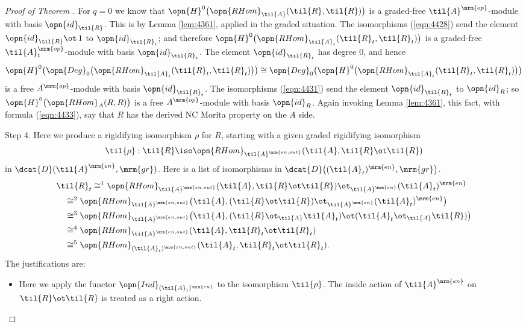 \begin{proof}[Proof of Theorem \tup{\ref{thm:4395}}]
For $q = 0$ we know that 
$\opn{H}^0 \bigl( \opn{RHom}_{\til{A}}(\til{R}, \til{R}) \bigr)$
is a graded-free $\til{A}^{\mrm{op}}$-module with basis $\opn{id}_{\til{R}}$. 
This is by Lemma \ref{lem:4361}, applied in the graded situation. 
The isomorphisms (\ref{eqn:4428}) send the element
$\opn{id}_{\til{R}} \ot \, 1$ to $\opn{id}_{\til{R}_t}$; and therefore \lb 
$\opn{H}^0 \bigl( \opn{RHom}_{\til{A}_t}(\til{R}_t, \til{R}_t) \bigr)$
is a graded-free $\til{A}_t^{\mrm{op}}$-module with basis 
$\opn{id}_{\til{R}_t}$.
The element $\opn{id}_{\til{R}_t}$ has degree $0$, and hence  
\[ \opn{H}^0 \bigl(  \opn{Deg}_0 \bigl( \opn{RHom}_{\til{A}_t}(\til{R}_t, 
\til{R}_t) \bigr) \bigr) \cong 
\opn{Deg}_0 \bigl( \opn{H}^0 \bigl(   \opn{RHom}_{\til{A}_t}(\til{R}_t, 
\til{R}_t) \bigr) \bigr) \]
is a free $A^{\mrm{op}}$-module with basis $\opn{id}_{\til{R}_t}$.
The isomorphisms (\ref{eqn:4431}) send the element 
$\opn{id}_{\til{R}_t}$ to $\opn{id}_{R}$; so 
$\opn{H}^0 \bigl( \opn{RHom}_{A}(R, R) \bigr)$ 
is a free $A^{\mrm{op}}$-module with basis $\opn{id}_{R}$.
Again invoking Lemma \ref{lem:4361}, this fact, with formula (\ref{eqn:4433}), 
say that $R$ has the derived NC Morita property on the $A$ side.  

\medskip \noindent
Step 4. Here we produce a rigidifying isomorphism $\rho$ for $R$, starting with 
a given graded rigidifying isomorphism 
\[ \til{\rho} : \til{R} \iso 
\opn{RHom}_{\til{A}^{\mrm{en, out}}} ( \til{A}, \til{R} \ot \til{R} ) \]
in $\dcat{D}(\til{A}^{\mrm{en}}, \mrm{gr})$.  
Here is a list of isomorphisms in 
$\dcat{D} \bigl( (\til{A}_t)^{\mrm{en}}, \mrm{gr} \bigr)$.
\begin{equation} \label{eqn:4435}
\begin{aligned}
& \til{R}_t \cong^1 
\opn{RHom}_{\til{A}^{\mrm{en, out}}} ( \til{A}, \til{R} \ot \til{R})
\ot_{\til{A}^{\mrm{en}}} (\til{A}_t)^{\mrm{en}}
\\
& \quad \cong^{2} 
\opn{RHom}_{\til{A}^{\mrm{en, out}}} \bigl( \til{A}, 
(\til{R} \ot \til{R}) \ot_{\til{A}^{\mrm{en}}} (\til{A}_t)^{\mrm{en}} \bigr)
\\
& \quad \cong^{3} 
\opn{RHom}_{\til{A}^{\mrm{en, out}}} 
\bigl( \til{A}, (\til{R} \ot_{\til{A}} \til{A}_t) \ot
(\til{A}_t \ot_{\til{A}} \til{R}) \bigr) 
\\
& \quad \cong^{4} 
\opn{RHom}_{\til{A}^{\mrm{en, out}}} (\til{A}, \til{R}_t \ot \til{R}_t) 
\\
& \quad \cong^{5} 
\opn{RHom}_{(\til{A}_t)^{\mrm{en, out}}} (\til{A}_t, \til{R}_t \ot \til{R}_t) .
\end{aligned}
\end{equation}
The justifications are:
\begin{itemize}
\item[$\cong^{1}$~:] Here we apply the functor 
$\opn{Ind}_{(\til{A}_t)^{\mrm{en}}}$ to the isomorphism $\til{\rho}$. The 
inside action of $\til{A}^{\mrm{en}}$ on $\til{R} \ot \til{R}$ is treated as 
a right action. 


\end{itemize}
\end{proof}

